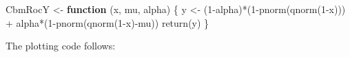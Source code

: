 \documentclass[
]{book}
\newenvironment{Shaded}{\begin{snugshade}}{\end{snugshade}}
\newcommand{\ControlFlowTok}[1]{\textcolor[rgb]{0.13,0.29,0.53}{\textbf{#1}}}
\newcommand{\DecValTok}[1]{\textcolor[rgb]{0.00,0.00,0.81}{#1}}
\newcommand{\FunctionTok}[1]{\textcolor[rgb]{0.00,0.00,0.00}{#1}}
\newcommand{\NormalTok}[1]{#1}
\newcommand{\OtherTok}[1]{\textcolor[rgb]{0.56,0.35,0.01}{#1}}
\newcommand{\SpecialCharTok}[1]{\textcolor[rgb]{0.00,0.00,0.00}{#1}}
\begin{document}
\begin{Shaded}
\begin{Highlighting}[]
\NormalTok{CbmRocY }\OtherTok{\textless{}{-}} \ControlFlowTok{function}\NormalTok{ (x, mu, alpha) \{}
\NormalTok{  y }\OtherTok{\textless{}{-}}\NormalTok{ (}\DecValTok{1}\SpecialCharTok{{-}}\NormalTok{alpha)}\SpecialCharTok{*}\NormalTok{(}\DecValTok{1}\SpecialCharTok{{-}}\FunctionTok{pnorm}\NormalTok{(}\FunctionTok{qnorm}\NormalTok{(}\DecValTok{1}\SpecialCharTok{{-}}\NormalTok{x))) }\SpecialCharTok{+} 
\NormalTok{    alpha}\SpecialCharTok{*}\NormalTok{(}\DecValTok{1}\SpecialCharTok{{-}}\FunctionTok{pnorm}\NormalTok{(}\FunctionTok{qnorm}\NormalTok{(}\DecValTok{1}\SpecialCharTok{{-}}\NormalTok{x)}\SpecialCharTok{{-}}\NormalTok{mu))}
  \FunctionTok{return}\NormalTok{(y)}
\NormalTok{\}}
\end{Highlighting}
\end{Shaded}

The plotting code follows:
\end{document}
